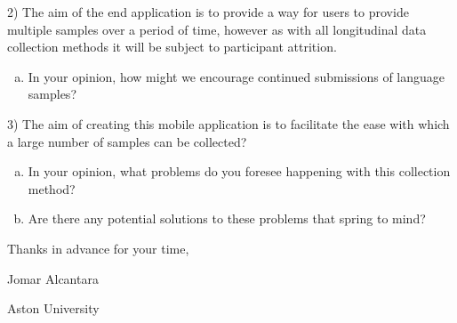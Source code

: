 \documentclass{letter}
\begin{document}
2) The aim of the end application is to provide a way for users to provide multiple samples over a period of time, however as with all longitudinal data collection methods it will be subject to participant attrition.
\begin{enumerate}[(a)]
	\item In your opinion, how might we encourage continued submissions of language samples?
\end{enumerate}

3) The aim of creating this mobile application is to facilitate the ease with which a large number of samples can be collected? 
\begin{enumerate}[(a)]
	\item In your opinion, what problems do you foresee happening with this collection method? 
	\item Are there any potential solutions to these problems that spring to mind?
\end{enumerate}

Thanks in advance for your time,

Jomar Alcantara

Aston University
\end{document}
